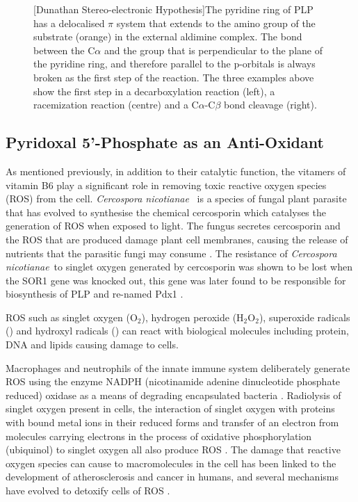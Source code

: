 \begin{figure}[!htbp]
\begin{minipage}{\linewidth}

	[Dunathan Stereo-electronic Hypothesis]{The pyridine ring of PLP has a delocalised $\pi$ system that extends to the amino group of the substrate (orange) in the external aldimine complex. The bond between the C$\alpha$ and the group that is perpendicular to the plane of the pyridine ring, and therefore parallel to the p-orbitals is always broken as the first step of the reaction. The three examples above show the first step in a decarboxylation reaction (left), a racemization reaction (centre) and a C$\alpha$-C$\beta$ bond cleavage (right).\label{fig:dunathan}}	
\end{minipage} 
\end{figure}
\newpage
\subsection{Pyridoxal 5'-Phosphate as an Anti-Oxidant}\label{sec:anti-oxidant}
As mentioned previously, in addition to their catalytic function, the vitamers of vitamin B6 play a significant role in removing toxic reactive oxygen species (ROS) from the cell. \textit{Cercospora nicotianae}~ is a species of fungal plant parasite that has evolved to synthesise the chemical cercosporin which catalyses the generation of ROS when exposed to light. The fungus secretes cercosporin and the ROS that are produced damage plant cell membranes, causing the release of nutrients that the parasitic fungi may consume \cite{Daub1983}. The resistance of \textit{Cercospora nicotianae}~to singlet oxygen generated by cercosporin was shown to be lost when the SOR1 gene was knocked out, this gene was later found to be responsible for biosynthesis of PLP and re-named Pdx1 \cite{Ehrenshaft1998}.\par

ROS such as singlet oxygen (O$_2$), hydrogen peroxide (H$_2$O$_2$), superoxide radicals () and hydroxyl radicals () can react with biological molecules including protein, DNA and lipids causing damage to cells. \par
Macrophages and neutrophils of the innate immune system deliberately generate ROS using the enzyme NADPH (nicotinamide adenine dinucleotide phosphate reduced) oxidase as a means of degrading encapsulated bacteria \cite{Forman2002}. Radiolysis of singlet oxygen present in cells, the interaction of singlet oxygen with proteins with bound metal ions in their reduced forms and transfer of an electron from molecules carrying electrons in the process of oxidative phosphorylation (ubiquinol) to singlet oxygen all also produce ROS \cite{Bartosz2003}. The damage that reactive oxygen species can cause to macromolecules in the cell has been linked to the development of atherosclerosis and cancer in humans, and several mechanisms have evolved to detoxify cells of ROS \cite{Diplock1997}. 

